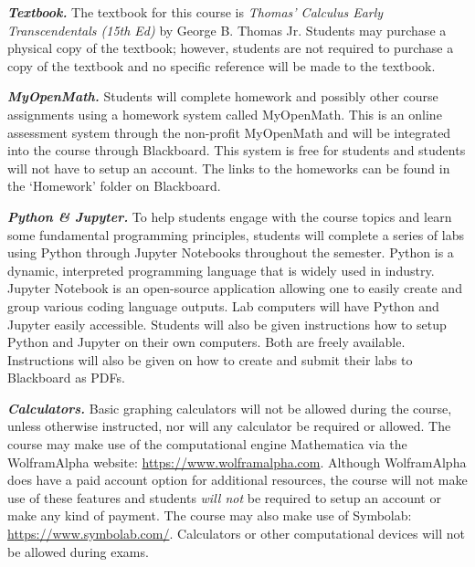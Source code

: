 \documentclass[11pt,letterpaper]{article}
\begin{document}

{\itshape\bfseries\color{scred}Textbook.} The textbook for this course is {\itshape Thomas' Calculus Early Transcendentals (15th Ed)} by George B. Thomas Jr. Students may purchase a physical copy of the textbook; however, students are not required to purchase a copy of the textbook and no specific reference will be made to the textbook. \pspace

{\itshape\bfseries\color{scred}MyOpenMath.} Students will complete homework and possibly other course assignments using a homework system called MyOpenMath. This is an online assessment system through the non-profit MyOpenMath and will be integrated into the course through Blackboard. This system is free for students and students will not have to setup an account. The links to the homeworks can be found in the `Homework' folder on Blackboard. \pspace

{\itshape\bfseries\color{scred}Python \& Jupyter.} To help students engage with the course topics and learn some fundamental programming principles, students will complete a series of labs using Python through Jupyter Notebooks throughout the semester. Python is a dynamic, interpreted programming language that is widely used in industry. Jupyter Notebook is an open-source application allowing one to easily create and group various coding language outputs. Lab computers will have Python and Jupyter easily accessible. Students will also be given instructions how to setup Python and Jupyter on their own computers. Both are freely available. Instructions will also be given on how to create and submit their labs to Blackboard as PDFs. \pspace





\newpage





{\itshape\bfseries\color{scred}Calculators.} Basic graphing calculators will not be allowed during the course, unless otherwise instructed, nor will any calculator be required or allowed. The course may make use of the computational engine Mathematica via the WolframAlpha website: \url{https://www.wolframalpha.com}. Although WolframAlpha does have a paid account option for additional resources, the course will not make use of these features and students {\itshape will not} be required to setup an account or make any kind of payment. The course may also make use of Symbolab: \url{https://www.symbolab.com/}. Calculators or other computational devices will not be allowed during exams. 
\sectionbreak
\end{document}
